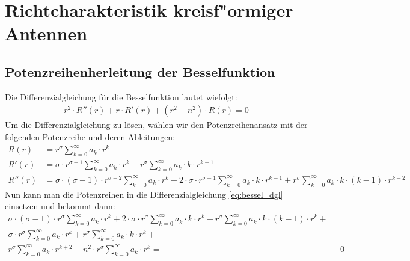 \chapter{Richtcharakteristik kreisf"ormiger Antennen\label{chapter:kreis}}
\begin{refsection}

\section{Potenzreihenherleitung der Besselfunktion}
Die Differenzialgleichung für die Besselfunktion lautet wiefolgt:
\begin{align}
	r^2 \cdot R''\left( r \right)
	+
	r \cdot R' \left( r \right)
	+
	\left( r^2 - n^2 \right) \cdot R \left( r \right)
	=
	0
	\label{eq:bessel_dgl}
\end{align}
Um die Differenzialgleichung zu l\"osen, w\"ahlen wir den Potenzreihenansatz mit der folgenden Potenzreihe und deren Ableitungen:
\begin{align*}
	R \left( r \right)
	&=
	r^{\sigma}
	\sum_{k=0}^{\infty} a_k \cdot r^k
\\
	R'\left( r \right)
	&=
	\sigma \cdot r^{\sigma - 1}
	\sum_{k=0}^{\infty} a_k \cdot r^k
	+
	r^{\sigma}
	\sum_{k=0}^{\infty} a_k \cdot k \cdot r^{k - 1}
\\
	R'' \left( r \right)
	&=
	\sigma \cdot \left( \sigma - 1 \right) \cdot r^{\sigma - 2}
	\sum_{k=0}^{\infty} a_k \cdot r^k
	+
	2 \cdot \sigma \cdot r^{\sigma - 1}
	\sum_{k=0}^{\infty} a_k \cdot k \cdot r^{k - 1}
	+
	r^{\sigma}
	\sum_{k=0}^{\infty} a_k \cdot k \cdot \left( k - 1 \right) \cdot r^{k - 2}	
\end{align*}
Nun kann man die Potenzreihen in die Differenzialgleichung \ref{eq:bessel_dgl} einsetzen und bekommt dann:
\begin{align*}
	\sigma \cdot \left( \sigma - 1 \right) \cdot r^{\sigma}
	\sum_{k=0}^{\infty} a_k \cdot r^k
	+
	2 \cdot \sigma \cdot r^{\sigma}
	\sum_{k=0}^{\infty} a_k \cdot k \cdot r^k
	+
	r^{\sigma}
	\sum_{k=0}^{\infty} a_k \cdot k \cdot \left( k - 1 \right) \cdot r^k
	+ \\
	\sigma \cdot r^{\sigma}
	\sum_{k=0}^{\infty} a_k \cdot r^k
	+
	r^{\sigma}
	\sum_{k=0}^{\infty} a_k \cdot k \cdot r^k
	+\\
	r^{\sigma}
	\sum_{k=0}^{\infty} a_k \cdot r^{k + 2}
	-
	n^2 \cdot r^{\sigma}
	\sum_{k=0}^{\infty} a_k \cdot r^k
	= & \text{ } 0
\end{align*}

\end{refsection}

